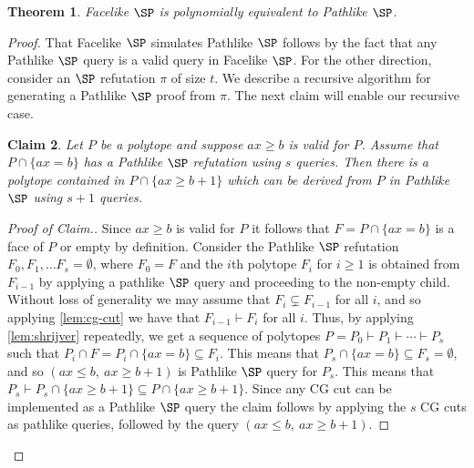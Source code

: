 \documentclass[11pt]{article}
\numberwithin{equation}{section}
\newtheorem{theorem}{Theorem}[section]
\newtheorem{claim}[theorem]{Claim}
\theoremstyle{definition}
\theoremstyle{plain}
\begin{document}
	\begin{theorem}
	\label{lem:SPtopSP}
		Facelike $\SP$ is polynomially equivalent to Pathlike $\SP$.	
	\end{theorem}
	\begin{proof}
		That Facelike $\SP$ simulates Pathlike $\SP$ follows by the fact that any Pathlike $\SP$ query is a valid query in Facelike $\SP$.  
		For the other direction, consider an $\SP$ refutation $\pi$ of size $t$. 
		We describe a recursive algorithm for generating a Pathlike $\SP$ proof from $\pi$.
		The next claim will enable our recursive case.
	
	\begin{claim}Let $P$ be a polytope and suppose $ax \geq b$ is valid for $P$. 
	Assume that $P \cap \{ax = b\}$ has a Pathlike $\SP$ refutation using $s$ queries. 
	Then there is a polytope contained in $P \cap \{ax \geq b+1\}$ which can be derived from $P$ in Pathlike $\SP$ using $s+1$ queries. \end{claim}
	\begin{proof}[Proof of Claim.]
		Since $ax \geq b$ is valid for $P$ it follows that $F = P \cap \{ax = b\}$ is a face of $P$ or empty by definition.
		Consider the Pathlike $\SP$ refutation  $F_0, F_1, \ldots F_s = \emptyset$, where $F_0=F$ and the $i$th polytope $F_i$ for $i \geq 1$ is obtained from $F_{i-1}$ by applying a pathlike $\SP$ query and proceeding to the non-empty child.
		Without loss of generality we may assume that $F_i \subsetneq F_{i-1}$ for all $i$, and so applying \autoref{lem:cg-cut} we have that $F_{i-1} \vdash F_i$ for all $i$.
		Thus, by applying \autoref{lem:shrijver} repeatedly, we get a sequence of polytopes $P = P_0 \vdash P_1 \vdash \cdots \vdash P_s$ such that $P_i \cap F = P_i \cap \{ax = b\} \subseteq F_i$. 
		This means that $P_s \cap \{ax = b\} \subseteq F_s = \emptyset$, and so $(ax \leq b,~ ax \geq b+1)$ is Pathlike $\SP$ query for $P_s$. 
		This means that $P_s \vdash P_s \cap \{ax \geq b+1\} \subseteq P \cap \{ax \geq b+1\}$.
		Since any CG cut can be implemented as a Pathlike $\SP$ query the claim follows by applying the $s$ CG cuts as pathlike queries, followed by the query $(ax \leq b,~ ax \geq b+1)$.
	\end{proof}
	

\end{proof}
\end{document}
